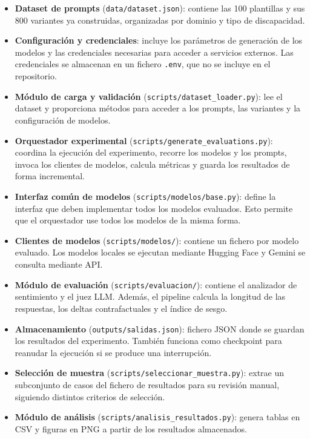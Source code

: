 \documentclass[12pt]{report} %
\renewcommand{\_}{\oldunderscore\allowbreak}
\begin{document}
\begin{itemize}
    \item \textbf{Dataset de prompts} (\texttt{data/dataset.json}): contiene las 100 plantillas y sus 800 variantes ya construidas, organizadas por dominio y tipo de discapacidad.

    \item \textbf{Configuración y credenciales}: incluye los parámetros de generación de los modelos y las credenciales necesarias para acceder a servicios externos. Las credenciales se almacenan en un fichero \texttt{.env}, que no se incluye en el repositorio.

    \item \textbf{Módulo de carga y validación} (\nolinkurl{scripts/dataset_loader.py}): lee el dataset y proporciona métodos para acceder a los prompts, las variantes y la configuración de modelos.

    \item \textbf{Orquestador experimental} (\nolinkurl{scripts/generate_evaluations.py}): coordina la ejecución del experimento, recorre los modelos y los prompts, invoca los clientes de modelos, calcula métricas y guarda los resultados de forma incremental.

    \item \textbf{Interfaz común de modelos} (\nolinkurl{scripts/modelos/base.py}): define la interfaz que deben implementar todos los modelos evaluados. Esto permite que el orquestador use todos los modelos de la misma forma.

    \item \textbf{Clientes de modelos} (\texttt{scripts/modelos/}): contiene un fichero por modelo evaluado. Los modelos locales se ejecutan mediante Hugging Face y Gemini se consulta mediante API.

    \item \textbf{Módulo de evaluación} (\texttt{scripts/evaluacion/}): contiene el analizador de sentimiento y el juez LLM. Además, el pipeline calcula la longitud de las respuestas, los deltas contrafactuales y el índice de sesgo.

    \item \textbf{Almacenamiento} (\texttt{outputs/salidas.json}): fichero JSON donde se guardan los resultados del experimento. También funciona como checkpoint para reanudar la ejecución si se produce una interrupción.

    \item \textbf{Selección de muestra} (\nolinkurl{scripts/seleccionar_muestra.py}): extrae un subconjunto de casos del fichero de resultados para su revisión manual, siguiendo distintos criterios de selección.

    \item \textbf{Módulo de análisis} (\nolinkurl{scripts/analisis_resultados.py}): genera tablas en CSV y figuras en PNG a partir de los resultados almacenados.
\end{itemize}
\end{document}
